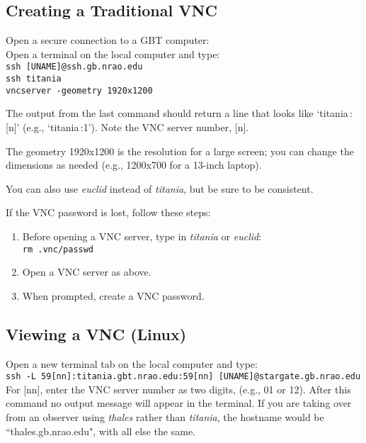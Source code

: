 \documentclass[11pt, reqno, tbtags]{article}
\begin{document}
\subsection{Creating a Traditional VNC}\label{ssec:vnc}  %
Open a secure connection to a GBT computer: \\
Open a terminal on the local computer and type: \\
\indent\texttt{ssh [UNAME]@ssh.gb.nrao.edu \\
\indent ssh titania \\                                                    
\indent vncserver -geometry 1920x1200}

\noindent The output from the last command should return a line that looks like `titania\,:[n]' (e.g., `titania\,:1'). Note the VNC server number, [n].         

\noindent The geometry 1920x1200 is the resolution for a large screen; you can change the dimensions as needed (e.g., 1200x700 for a 13-inch laptop).  

\noindent You can also use \textit{euclid} instead of \textit{titania}, but be sure to be consistent.      

\noindent If the VNC password is lost, follow these steps: \begin{enumerate}
 \item Before opening a VNC server, type in \textit{titania} or \textit{euclid}: \\            
 \texttt{rm .vnc/passwd}
 \item Open a VNC server as above.  
 \item When prompted, create a VNC password. 
\end{enumerate}

\subsection{Viewing a VNC (Linux)} \label{ssec:vncl}  %
Open a new terminal tab on the local computer and type: \\
\indent\texttt{ssh -L 59[nn]:titania.gbt.nrao.edu:59[nn] [UNAME]@stargate.gb.nrao.edu} \\          
For [nn], enter the VNC server number as two digits, (e.g., 01 or 12). After this command no output message will appear in the terminal.  If you are taking over from an observer using \textit{thales} rather than \textit{titania}, the hostname would be ``thales.gb.nrao.edu", with all else the same.    
\end{document}
